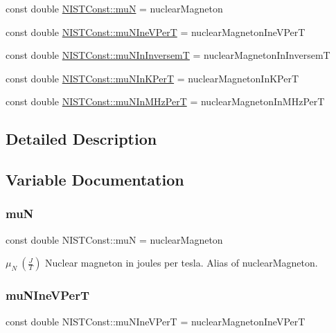 \begin{DoxyCompactItemize}
\item 
const double \hyperlink{group___nuclear_magneton_ga5b19bcb311479cc6f5c36b551356e580}{N\+I\+S\+T\+Const\+::muN} = nuclear\+Magneton
\item 
const double \hyperlink{group___nuclear_magneton_ga2c8a56a6542df06b37fed3b2b5444ff6}{N\+I\+S\+T\+Const\+::mu\+N\+Ine\+V\+PerT} = nuclear\+Magneton\+Ine\+V\+PerT
\item 
const double \hyperlink{group___nuclear_magneton_ga9c4499c279614bf4bb837c9c4c74b208}{N\+I\+S\+T\+Const\+::mu\+N\+In\+InversemT} = nuclear\+Magneton\+In\+InversemT
\item 
const double \hyperlink{group___nuclear_magneton_gaca6a801a34347be9fd04e7882187484c}{N\+I\+S\+T\+Const\+::mu\+N\+In\+K\+PerT} = nuclear\+Magneton\+In\+K\+PerT
\item 
const double \hyperlink{group___nuclear_magneton_ga4c2e37b42112c282a0dc5969f351187e}{N\+I\+S\+T\+Const\+::mu\+N\+In\+M\+Hz\+PerT} = nuclear\+Magneton\+In\+M\+Hz\+PerT
\end{DoxyCompactItemize}


\subsection{Detailed Description}


\subsection{Variable Documentation}
\mbox{\label{group___nuclear_magneton_ga5b19bcb311479cc6f5c36b551356e580}} 
\subsubsection{\texorpdfstring{muN}{muN}}
{\footnotesize\ttfamily const double N\+I\+S\+T\+Const\+::muN = nuclear\+Magneton}

$\mu_N \ (\frac{J}{T})$ Nuclear magneton in joules per tesla. Alias of nuclear\+Magneton. \mbox{\label{group___nuclear_magneton_ga2c8a56a6542df06b37fed3b2b5444ff6}} 
\subsubsection{\texorpdfstring{mu\+N\+Ine\+V\+PerT}{muNIneVPerT}}
{\footnotesize\ttfamily const double N\+I\+S\+T\+Const\+::mu\+N\+Ine\+V\+PerT = nuclear\+Magneton\+Ine\+V\+PerT}


